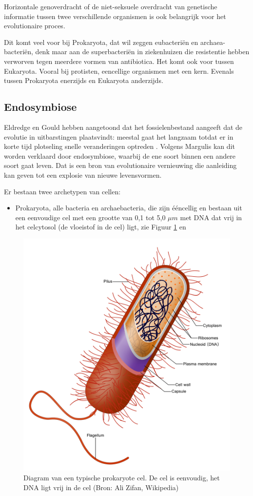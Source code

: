 \documentclass[
  11pt,
]{book}
\providecommand{\tightlist}{%
  \setlength{\itemsep}{0pt}\setlength{\parskip}{0pt}}
\begin{document}
Horizontale genoverdracht of de niet-seksuele overdracht van genetische informatie tussen twee verschillende organismen is ook belangrijk voor het evolutionaire proces.

Dit komt veel voor bij Prokaryota, dat wil zeggen eubacteriën en archaea-bacteriën, denk maar aan de superbacteriën in ziekenhuizen die resistentie hebben verworven tegen meerdere vormen van antibiotica. Het komt ook voor tussen Eukaryota. Vooral bij protisten, eencellige organismen met een kern. Evenals tussen Prokaryota enerzijds en Eukaryota anderzijds.

\hypertarget{endosymbiose}{%
\subsection{Endosymbiose}\label{endosymbiose}}

Eldredge en Gould hebben aangetoond dat het fossielenbestand aangeeft dat de evolutie in uitbarstingen plaatsvindt: meestal gaat het langzaam totdat er in korte tijd plotseling snelle veranderingen optreden \citep{margulis1999}. Volgens Margulis kan dit worden verklaard door endosymbiose, waarbij de ene soort binnen een andere soort gaat leven. Dat is een bron van evolutionaire vernieuwing die aanleiding kan geven tot een explosie van nieuwe levensvormen.

Er bestaan twee archetypen van cellen:

\begin{itemize}
\tightlist
\item
  Prokaryota, alle bacteria en archaebacteria, die zijn ééncellig en bestaan uit een eenvoudige cel met een grootte van 0,1 tot 5,0 \(\mu m\) met DNA dat vrij in het celcytosol (de vloeistof in de cel) ligt, zie Figuur \ref{fig:prokaryotaCell} en
\end{itemize}

\begin{figure}

{\centering \includegraphics[width=0.5\linewidth]{./figs/prokaryoteCell} 

}

\caption{ Diagram van een typische prokaryote cel. De cel is eenvoudig, het DNA ligt vrij in de cel (Bron: Ali Zifan, Wikipedia)}\label{fig:prokaryotaCell}
\end{figure}
\end{document}

